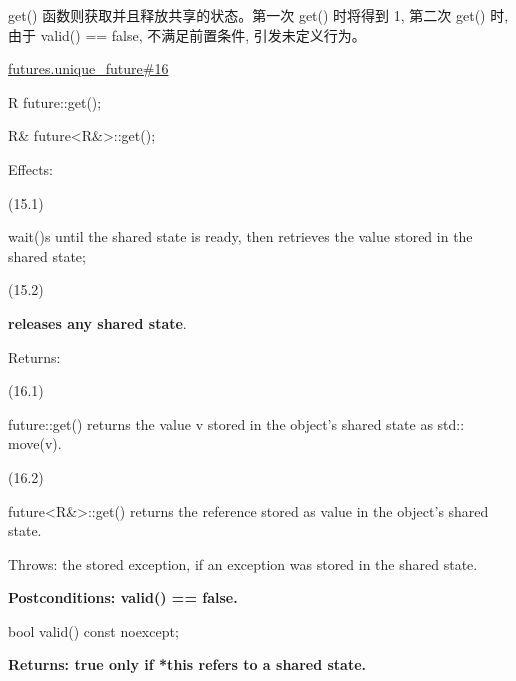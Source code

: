 \documentclass{article}
\begin{document}
	get() 函数则获取并且释放共享的状态。第一次 get() 时将得到 1, 第二次 get() 时, 由于 valid() == false, 不满足前置条件, 引发未定义行为。
	
	\href{https://timsong-cpp.github.io/cppwp/n4659/futures.unique_future#16}{futures.unique\_future\#16}
	\begin{lightgrayleftbar}
		R future::get();
	
		R\& future<R\&>::get();
		
		Effects:
		
		(15.1)
		
		wait()s until the shared state is ready, then retrieves the value stored in the shared state;
		
		(15.2)
		
		\textbf{releases any shared state}. 
		
		Returns:
		
		(16.1)
		
		future​::​get() returns the value v stored in the object's shared state as std​::​move(v).
		
		(16.2)
		
		future<R\&>​::​get() returns the reference stored as value in the object's shared state.
		
		Throws: the stored exception, if an exception was stored in the shared state.
		
		\textbf{Postconditions: valid() == false.}
		
		bool valid() const noexcept;
		
		\textbf{Returns: true only if *this refers to a shared state. }
	\end{lightgrayleftbar}
	
\end{document}
